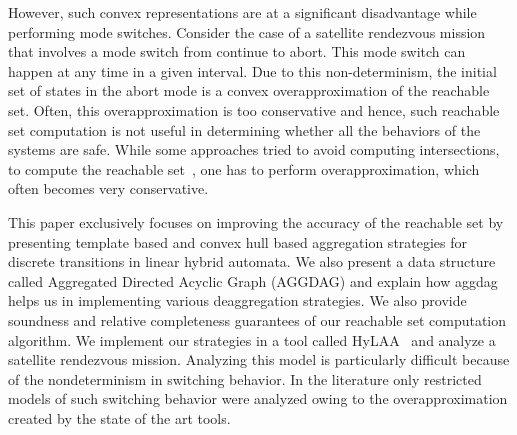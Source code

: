 However, such convex representations are at a significant disadvantage while performing mode switches.
%
Consider the case of a satellite rendezvous mission that involves a mode switch from continue to abort.
%
This mode switch can happen at any time in a given interval. 
%
Due to this non-determinism, the initial set of states in the abort mode is a convex overapproximation of the reachable set. 
%
Often, this overapproximation is too conservative and hence, such reachable set computation is not useful in determining whether all the behaviors of the systems are safe. 
%
While some approaches tried to avoid computing intersections, to compute the reachable set~\cite{althoff2012avoiding}, one has to perform overapproximation, which often becomes very conservative.
%

This paper exclusively focuses on improving the accuracy of the reachable set by presenting template based and convex hull based aggregation strategies for discrete transitions in linear hybrid automata.
%
We also present a data structure called Aggregated Directed Acyclic Graph (AGGDAG) and explain how aggdag helps us in implementing various deaggregation strategies. 
%
%
We also provide soundness and relative completeness guarantees of our reachable set computation algorithm.
%
We implement our strategies in a tool called HyLAA~\cite{bak2017hscc} and analyze a satellite rendezvous mission.
%
Analyzing this model is particularly difficult because of the nondeterminism in switching behavior.
%
In the literature only restricted models of such switching behavior were analyzed owing to the overapproximation created by the state of the art tools.


